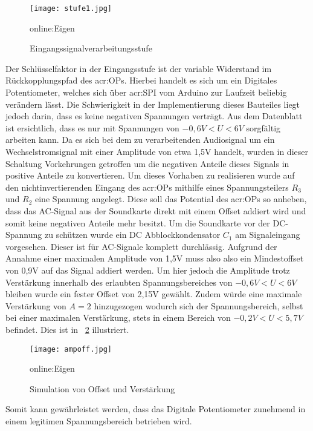 \begin{figure}[H]
	\centering
	\texttt{[image: stufe1.jpg]}
	\caption[Eingangssignalverarbeitungsstufe]{Eingangssignalverarbeitungsstufe} \gls{online:Eigen}
	\label{fig:stufe1}
\end{figure}

Der Schlüsselfaktor in der Eingangsstufe ist der variable Widerstand im Rückkopplungspfad des \gls{acr:OP}s. Hierbei handelt es sich um ein Digitales Potentiometer, welches sich über \gls{acr:SPI} vom Arduino zur Laufzeit beliebig verändern lässt. Die Schwierigkeit in der Implementierung dieses Bauteiles liegt jedoch darin, dass es keine negativen Spannungen verträgt. Aus dem Datenblatt ist ersichtlich, dass es nur mit Spannungen von $-0,6V<U<6V$ sorgfältig arbeiten kann. Da es sich bei dem zu verarbeitenden Audiosignal um ein Wechselstromsignal mit einer Amplitude von etwa 1,5V handelt, wurden in dieser Schaltung Vorkehrungen getroffen um die negativen Anteile dieses Signals in positive Anteile zu konvertieren. Um dieses Vorhaben zu realisieren wurde auf den nichtinvertierenden Eingang des \gls{acr:OP}s mithilfe eines Spannungsteilers $R_{3}$ und $R_{2}$ eine Spannung angelegt. Diese soll das Potential des \gls{acr:OP}s so anheben, dass das AC-Signal aus der Soundkarte direkt mit einem Offset addiert wird und somit keine negativen Anteile mehr besitzt. Um die Soundkarte vor der DC-Spannung zu schützen wurde ein DC Abblockkondensator $C_{1}$ am Signaleingang vorgesehen. Dieser ist für AC-Signale komplett durchlässig. Aufgrund der Annahme einer maximalen Amplitude von 1,5V muss also also ein Mindestoffset von 0,9V auf das Signal addiert werden. Um hier jedoch die Amplitude trotz Verstärkung innerhalb des erlaubten Spannungsbereiches von $-0,6V<U<6V$ bleiben wurde ein fester Offset von 2,15V gewählt. Zudem würde eine maximale Verstärkung von $A=2$ hinzugezogen wodurch sich der Spannungsbereich, selbst bei einer maximalen Verstärkung, stets in einem Bereich von $-0,2V<U<5,7V$ befindet. Dies ist in ~\ref{fig:ampoff} illustriert. 


\begin{figure}[H]
	\centering
	\texttt{[image: ampoff.jpg]}
	\caption[Simulation von Offset und Verstärkung]{Simulation von Offset und Verstärkung} \gls{online:Eigen}
	\label{fig:ampoff}
\end{figure}

Somit kann gewährleistet werden, dass das Digitale Potentiometer zunehmend in einem legitimen Spannungsbereich betrieben wird.

